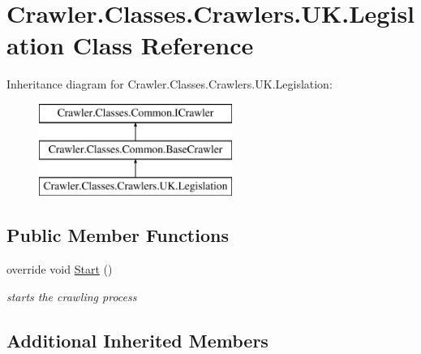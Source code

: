 \hypertarget{class_crawler_1_1_classes_1_1_crawlers_1_1_u_k_1_1_legislation}{\section{Crawler.\-Classes.\-Crawlers.\-U\-K.\-Legislation Class Reference}
\label{class_crawler_1_1_classes_1_1_crawlers_1_1_u_k_1_1_legislation}
}
Inheritance diagram for Crawler.\-Classes.\-Crawlers.\-U\-K.\-Legislation\-:\begin{figure}[H]
\begin{center}
\leavevmode
\includegraphics[height=3.000000cm]{class_crawler_1_1_classes_1_1_crawlers_1_1_u_k_1_1_legislation}
\end{center}
\end{figure}
\subsection*{Public Member Functions}
\begin{DoxyCompactItemize}
\item 
override void \hyperlink{class_crawler_1_1_classes_1_1_crawlers_1_1_u_k_1_1_legislation_a09e9b181965e055ef411760f328f7599}{Start} ()
\begin{DoxyCompactList}\small\item\em starts the crawling process \end{DoxyCompactList}\end{DoxyCompactItemize}
\subsection*{Additional Inherited Members}


